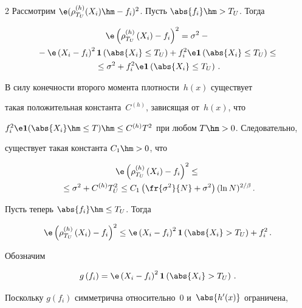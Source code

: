 \begin{multicols}{2}
Рассмотрим $\e(\rho_{T_U}^{(h)}(X_i)\hm-f_i)^2$. Пусть $\abs{f_i}\hm>T_U$. Тогда

\begin{multline*}

\e\left(\rho_{T_U}^{(h)}\left(X_i\right)-f_i\right)^2=\sigma^2-{}\\

{}-

\e\left(X_i-f_i\right)^2\It\left(\abs{X_i}\leq T_U\right)+f_i^2\e\It

\left(\abs{X_i}\leq T_U\right) \leq{}\\

{}\leq \sigma^2+f_i^2\e\It\left(\abs{X_i}\leq T_U\right)\,.

\end{multline*}



В силу конечности второго момента плот\-ности~$h(x)$ существует 

такая положительная константа~$C^{(h)}$, зависящая от~$h(x)$, что 

$f_i^2\e\It(\abs{X_i}\hm\leq T)\hm\leq C^{(h)}T^2$ при любом $T\hm>0$. Следовательно, 

существует такая константа $C_1\hm>0$, что

\begin{multline*}

\e\left(\rho_{T_U}^{(h)}\left(X_i\right)-f_i\right)^2\leq {}\\

{}\leq

\sigma^2+C^{(h)}T_U^2\leq C_1\left(\fr{\sigma^2}{N}+\sigma^2\right)

(\ln N)^{2/\beta}\,.

\end{multline*}

Пусть теперь $\abs{f_i}\hm\leq T_U$. Тогда

$$

\e\left(\rho_{T_U}^{(h)}\left(X_i\right)-f_i\right)^2\leq\e\left(X_i-f_i\right)^2\It

\left(\abs{X_i}> T_U\right)+f_i^2\,.

$$

Обозначим

$$

g\left(f_i\right)=\e\left(X_i-f_i\right)^2\It\left(\abs{X_i}> T_U\right)\,.

$$

Поскольку $g(f_i)$ симметрична относительно~0 и~$\abs{h'(x)}$ ограничена,


\end{multicols}
